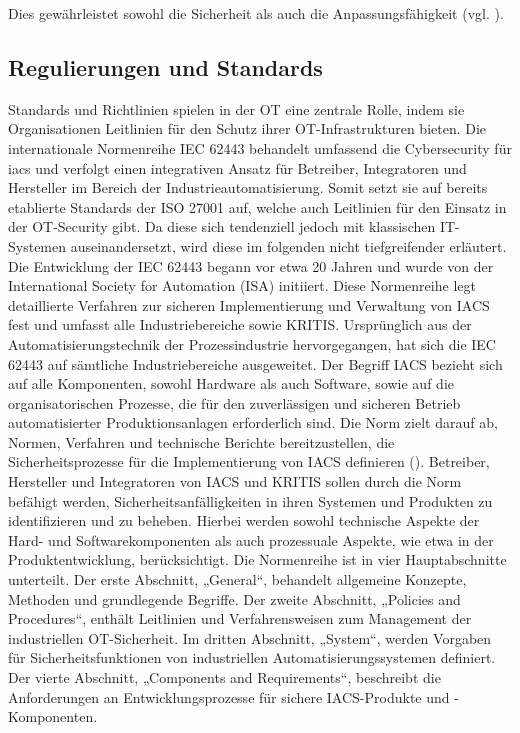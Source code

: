 Dies gewährleistet sowohl die Sicherheit als auch die Anpassungsfähigkeit (vgl. \cite{securityInsider}).



\subsection{Regulierungen und Standards}
Standards und Richtlinien spielen in der OT eine zentrale Rolle, indem sie Organisationen Leitlinien für den Schutz ihrer OT-Infrastrukturen bieten. Die internationale Normenreihe IEC 62443 behandelt umfassend die Cybersecurity für \ac{iacs} und verfolgt einen integrativen Ansatz für Betreiber, Integratoren und Hersteller im Bereich der Industrieautomatisierung. Somit setzt sie auf bereits etablierte Standards der ISO 27001 auf, welche auch Leitlinien für den Einsatz in der OT-Security gibt. Da diese sich tendenziell jedoch mit klassischen IT-Systemen auseinandersetzt, wird diese im folgenden nicht tiefgreifender erläutert. Die Entwicklung der IEC 62443 begann vor etwa 20 Jahren und wurde von der International Society for Automation (ISA) initiiert. \clearpage \noindent Diese Normenreihe legt detaillierte Verfahren zur sicheren Implementierung und Verwaltung von IACS fest und umfasst alle Industriebereiche sowie KRITIS. Ursprünglich aus der Automatisierungstechnik der Prozessindustrie hervorgegangen, hat sich die IEC 62443 auf sämtliche Industriebereiche ausgeweitet. Der Begriff IACS bezieht sich auf alle Komponenten, sowohl Hardware als auch Software, sowie auf die organisatorischen Prozesse, die für den zuverlässigen und sicheren Betrieb automatisierter Produktionsanlagen erforderlich sind. Die Norm zielt darauf ab, Normen, Verfahren und technische Berichte bereitzustellen, die Sicherheitsprozesse für die Implementierung von IACS definieren (\cite{DKE}). Betreiber, Hersteller und Integratoren von IACS und KRITIS sollen durch die Norm befähigt werden, Sicherheitsanfälligkeiten in ihren Systemen und Produkten zu identifizieren und zu beheben. Hierbei werden sowohl technische Aspekte der Hard- und Softwarekomponenten als auch prozessuale Aspekte, wie etwa in der Produktentwicklung, berücksichtigt.
Die Normenreihe ist in vier Hauptabschnitte unterteilt. Der erste Abschnitt, „General“, behandelt allgemeine Konzepte, Methoden und grundlegende Begriffe. Der zweite Abschnitt, „Policies and Procedures“, enthält Leitlinien und Verfahrensweisen zum Management der industriellen OT-Sicherheit. Im dritten Abschnitt, „System“, werden Vorgaben für Sicherheitsfunktionen von industriellen Automatisierungssystemen definiert. Der vierte Abschnitt, „Components and Requirements“, beschreibt die Anforderungen an Entwicklungsprozesse für sichere IACS-Produkte und -Komponenten.
